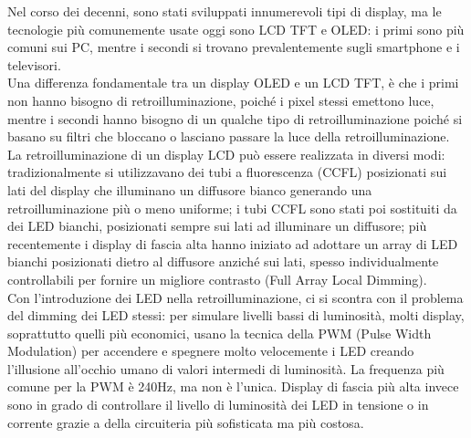 Nel corso dei decenni, sono stati sviluppati innumerevoli tipi di display, ma le tecnologie più comunemente usate oggi sono LCD TFT e OLED: i primi sono più comuni sui PC, mentre i secondi si trovano prevalentemente sugli smartphone e i televisori.\\
Una differenza fondamentale tra un display OLED e un LCD TFT, è che i primi non hanno bisogno di retroilluminazione, poiché i pixel stessi emettono luce, mentre i secondi hanno bisogno di un qualche tipo di retroilluminazione poiché si basano su filtri che bloccano o lasciano passare la luce della retroilluminazione.\\
La retroilluminazione di un display LCD può essere realizzata in diversi modi: tradizionalmente si utilizzavano dei tubi a fluorescenza (CCFL) posizionati sui lati del display che illuminano un diffusore bianco generando una retroilluminazione più o meno uniforme; i tubi CCFL sono stati poi sostituiti da dei LED bianchi, posizionati sempre sui lati ad illuminare un diffusore; più recentemente i display di fascia alta hanno iniziato ad adottare un array di LED bianchi posizionati dietro al diffusore anziché sui lati, spesso individualmente controllabili per fornire un migliore contrasto (Full Array Local Dimming).\\
Con l'introduzione dei LED nella retroilluminazione, ci si scontra con il problema del dimming dei LED stessi: per simulare livelli bassi di luminosità, molti display, soprattutto quelli più economici, usano la tecnica della PWM (Pulse Width Modulation) per accendere e spegnere molto velocemente i LED creando l'illusione all'occhio umano di valori intermedi di luminosità. La frequenza più comune per la PWM è 240Hz, ma non è l'unica. Display di fascia più alta invece sono in grado di controllare il livello di luminosità dei LED in tensione o in corrente grazie a della circuiteria più sofisticata ma più costosa.

